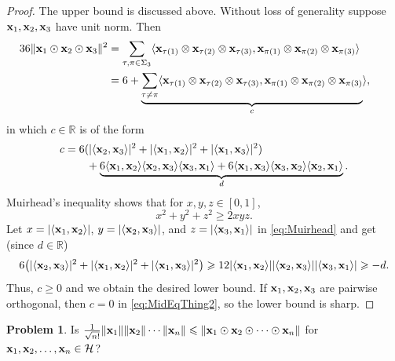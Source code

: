 \documentclass[10pt,reqno]{amsart}
\newcommand{\0}{{\color{lightgray}0}}
\newcommand{\R}{\mathbb{R}}
\renewcommand{\leq}{\leqslant}
\renewcommand{\geq}{\geqslant}
\newcommand{\norm}[1]{\| #1 \|}
\newcommand{\h}{\mathcal{H}}
\renewcommand{\vec}[1]{{\bf #1}}
\theoremstyle{definition}
\newcounter{problem}
\newtheorem{Problem}[problem]{Problem}
\numberwithin{equation}{section}
\begin{document}
\begin{proof}
The upper bound is discussed above.  Without loss of generality suppose
$\vec{x}_1, \vec{x}_2, \vec{x}_3 $ have unit norm.  Then
\begin{align}
     \!\!\!\!\!\!\!\!\!\!36\| \vec{x}_1 \odot \vec{x}_2 \odot \vec{x}_3 \|^2 
    &=   \sum_{\tau,\pi \in \Sigma_3} \langle \vec{x}_{\tau(1)} \otimes \vec{x}_{\tau(2)} \otimes \vec{x}_{\tau(3)} , \vec{x}_{\pi(1)} \otimes \vec{x}_{\pi(2)} \otimes \vec{x}_{\pi(3)} \rangle  \\
    & = 6 + \underbrace{\sum_{\tau \neq \pi} \langle \vec{x}_{\tau(1)} \otimes \vec{x}_{\tau(2)} \otimes \vec{x}_{\tau(3)} , \vec{x}_{\pi(1)} \otimes \vec{x}_{\pi(2)} \otimes \vec{x}_{\pi(3)}}_{c} \rangle , \label{eq:MidEqThing2}
\end{align}
in which $c\in \R$ is of the form
\begin{align}
c &= 6 (| \langle \vec{x}_2, \vec{x}_3 \rangle |^2 +  | \langle \vec{x}_1, \vec{x}_2 \rangle |^2   + | \langle \vec{x}_1, \vec{x}_3 \rangle |^2 ) \\
&\qquad+ \underbrace{6 \langle \vec{x}_1, \vec{x}_2 \rangle \langle \vec{x}_2, \vec{x}_3 \rangle \langle \vec{x}_3, \vec{x}_1 \rangle + 6  \langle \vec{x}_1, \vec{x}_3 \rangle \langle \vec{x}_3, \vec{x}_2 \rangle \langle \vec{x}_2, \vec{x}_1 \rangle}_{d}. 
\end{align}
Muirhead's inequality \cite[Ch.~2, Sec.~18]{Hardy} shows that for  $x,y,z \in [0,1]$,
\begin{equation}\label{eq:Muirhead}
    x^2 + y^2 + z^2 \geq 2 xyz.
\end{equation}
Let $x = |\langle \vec{x}_1, \vec{x}_2\rangle|$, $y = |\langle \vec{x}_2, \vec{x}_3\rangle|$,
and $z = |\langle \vec{x}_3, \vec{x}_1\rangle| $ in \eqref{eq:Muirhead} and get (since $d\in \R$)
\begin{equation*}
6 \big(| \langle \vec{x}_2, \vec{x}_3\rangle |^2 +  | \langle \vec{x}_1, \vec{x}_2\rangle |^2   +  |\langle \vec{x}_1, \vec{x}_3\rangle |^2 \big) \geq 12 |\langle \vec{x}_1, \vec{x}_2\rangle| |\langle \vec{x}_2, \vec{x}_3 \rangle| |\langle \vec{x}_3, \vec{x}_1 \rangle| \geq - d .
\end{equation*}
Thus, $c \geq 0$ and we obtain the desired lower bound.  If $\vec{x}_1, \vec{x}_2, \vec{x}_3$ are pairwise orthogonal, then $c=0$ in \eqref{eq:MidEqThing2}, so the lower bound is sharp.
\end{proof}


\begin{Problem}
Is $\frac{1}{\sqrt{n!}} \norm{ \vec{x}_1} \norm{\vec{x}_2} \cdots \norm{ \vec{x}_n} \leq
\norm{ \vec{x}_1 \odot \vec{x}_2 \odot \cdots \odot \vec{x}_n}$ for $\vec{x}_1, \vec{x}_2, \ldots,\vec{x}_n \in \h$?
\end{Problem}
\end{document}
